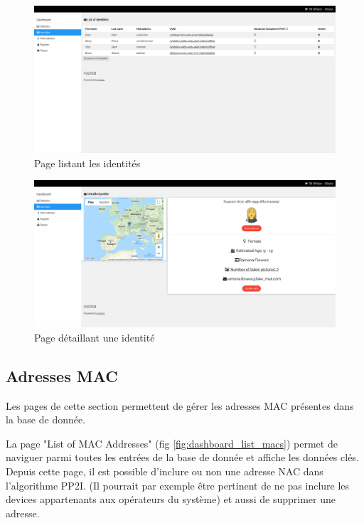 \clearpage
\newpage
\thispagestyle{empty}
\begin{landscape}
    \centering
\thispagestyle{empty}
\begin{figure}[h]
	\includegraphics[width=\linewidth]{images/dashboard/identities.png}
	\caption{Page listant les identités}
	\label{fig:dashboard_list_identities}
\end{figure}
\end{landscape}

\clearpage
\newpage
\thispagestyle{empty}
\begin{landscape}
    \centering
\thispagestyle{empty}
\begin{figure}[h]
	\includegraphics[width=\linewidth]{images/dashboard/detailled_identities.png}
	\caption{Page détaillant une identité}
	\label{fig:dashboard_identity}
\end{figure}
\end{landscape}

\subsection{Adresses MAC}
Les pages de cette section permettent de gérer les adresses MAC présentes dans la base de donnée.

La page "List of MAC Addresses" (fig \ref{fig:dashboard_list_macs}) permet de naviguer parmi toutes les entrées de la base de donnée et affiche les données clés.
Depuis cette page, il est possible d'inclure ou non une adresse NAC dans l'algorithme PP2I. (Il pourrait par exemple être pertinent de ne pas inclure les devices appartenants aux opérateurs du système)
et aussi de supprimer une adresse.

